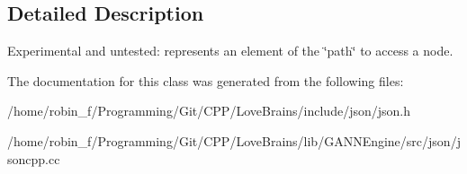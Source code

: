 \subsection{Detailed Description}
Experimental and untested\+: represents an element of the \char`\"{}path\char`\"{} to access a node. 

The documentation for this class was generated from the following files\+:\begin{DoxyCompactItemize}
\item 
/home/robin\+\_\+f/\+Programming/\+Git/\+C\+P\+P/\+Love\+Brains/include/json/json.\+h\item 
/home/robin\+\_\+f/\+Programming/\+Git/\+C\+P\+P/\+Love\+Brains/lib/\+G\+A\+N\+N\+Engine/src/json/jsoncpp.\+cc\end{DoxyCompactItemize}
